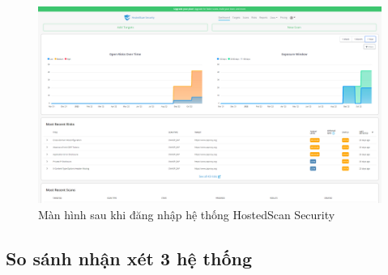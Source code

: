 \begin{figure}[H]
    \centering
    \includegraphics[width=\textwidth]{applied-thesis-chapters/chapter-1/hostedscan.com_dashboard.png}
    \caption{Màn hình sau khi đăng nhập hệ thống HostedScan Security}
\end{figure}

\newpage
\subsection{So sánh nhận xét 3 hệ thống}


